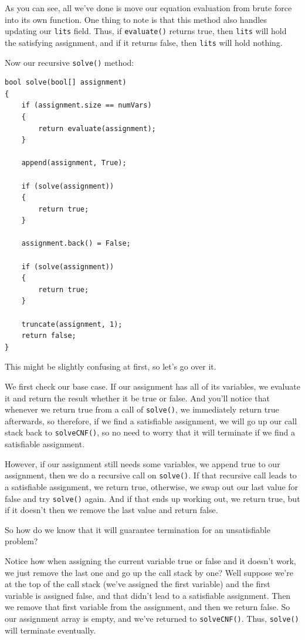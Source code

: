 As you can see, all we've done is move our equation evaluation from brute force
into its own function. One thing to note is that this method also handles
updating our \texttt{lits} field. Thus, if \texttt{evaluate()} returns true, then
\texttt{lits} will hold the satisfying assignment, and if it returns false, then
\texttt{lits} will hold nothing.

Now our recursive \texttt{solve()} method:

\begin{lstlisting}
bool solve(bool[] assignment)
{
    if (assignment.size == numVars)
    {
        return evaluate(assignment);
    }

    append(assignment, True);

    if (solve(assignment))
    {
        return true;
    }

    assignment.back() = False;

    if (solve(assignment))
    {
        return true;
    }

    truncate(assignment, 1);
    return false;
}
\end{lstlisting}

This might be slightly confusing at first, so let's go over it.

We first check our base case. If our assignment has all of its variables, we
evaluate it and return the result whether it be true or false. And you'll notice
that whenever we return true from a call of \texttt{solve()}, we immediately
return true afterwards, so therefore, if we find a satisfiable assignment, we
will go up our call stack back to \texttt{solveCNF()}, so no need to worry that
it will terminate if we find a satisfiable assignment.

However, if our assignment still needs some variables, we append true to our
assignment, then we do a recursive call on \texttt{solve()}. If that recursive
call leads to a satisfiable assignment, we return true, otherwise, we swap out
our last value for false and try \texttt{solve()} again. And if that ends up
working out, we return true, but if it doesn't then we remove the last value
and return false.

So how do we know that it will guarantee termination for an unsatisfiable
problem?

Notice how when assigning the current variable true or false and it doesn't
work, we just remove the last one and go up the call stack by one? Well
suppose we're at the top of the call stack (we've assigned the first variable)
and the first variable is assigned false, and that didn't lead to a satisfiable
assignment. Then we remove that first variable from the assignment, and then
we return false. So our assignment array is empty, and we've returned to
\texttt{solveCNF()}. Thus, \texttt{solve()} will terminate eventually.

